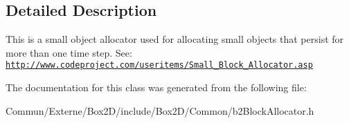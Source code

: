 \subsection{Detailed Description}
This is a small object allocator used for allocating small objects that persist for more than one time step. See\+: \href{http://www.codeproject.com/useritems/Small_Block_Allocator.asp}{\tt http\+://www.\+codeproject.\+com/useritems/\+Small\+\_\+\+Block\+\_\+\+Allocator.\+asp} 

The documentation for this class was generated from the following file\+:\begin{DoxyCompactItemize}
\item 
Commun/\+Externe/\+Box2\+D/include/\+Box2\+D/\+Common/b2\+Block\+Allocator.\+h\end{DoxyCompactItemize}
